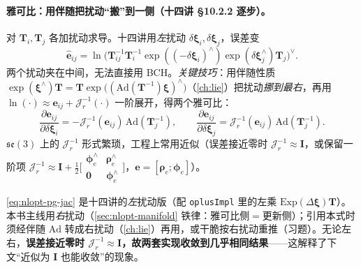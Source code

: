 \paragraph{雅可比：用伴随把扰动“搬”到一侧（十四讲 §10.2.2 逐步）。}\cite{gaoxiang2019slam14}
对 $\mathbf{T}_i,\mathbf{T}_j$ 各加扰动求导。十四讲用\emph{左}扰动 $\delta\boldsymbol{\xi}_i,\delta\boldsymbol{\xi}_j$，误差变
\begin{equation}
  \hat{\mathbf{e}}_{ij}=\ln\!\big(\mathbf{T}_{ij}^{-1}\mathbf{T}_i^{-1}\exp((-\delta\boldsymbol{\xi}_i)^\wedge)\exp(\delta\boldsymbol{\xi}_j^\wedge)\mathbf{T}_j\big)^\vee.
  \label{eq:nlopt-pg-pert}
\end{equation}
两个扰动夹在中间，无法直接用 BCH。\emph{关键技巧}：用伴随性质 $\exp(\boldsymbol{\xi}^\wedge)\mathbf{T}=\mathbf{T}\exp\big((\mathrm{Ad}(\mathbf{T}^{-1})\boldsymbol{\xi})^\wedge\big)$（\cref{ch:lie}）把扰动\emph{挪到最右}，再用 $\ln(\cdot)\approx\mathbf{e}_{ij}+\mathcal{J}_r^{-1}(\cdot)$ 一阶展开，得两个雅可比：
\begin{equation}
  \frac{\partial\mathbf{e}_{ij}}{\partial\delta\boldsymbol{\xi}_i}=-\mathcal{J}_r^{-1}(\mathbf{e}_{ij})\,\mathrm{Ad}(\mathbf{T}_j^{-1}),\qquad
  \frac{\partial\mathbf{e}_{ij}}{\partial\delta\boldsymbol{\xi}_j}=\mathcal{J}_r^{-1}(\mathbf{e}_{ij})\,\mathrm{Ad}(\mathbf{T}_j^{-1}).
  \label{eq:nlopt-pg-jac}
\end{equation}
$\mathfrak{se}(3)$ 上的 $\mathcal{J}_r^{-1}$ 形式繁琐，工程上常用近似（误差接近零时 $\mathcal{J}_r^{-1}\approx\mathbf{I}$，或保留一阶项 $\mathcal{J}_r^{-1}\approx\mathbf{I}+\tfrac12\big[\begin{smallmatrix}\boldsymbol{\phi}_e^\wedge&\boldsymbol{\rho}_e^\wedge\\\mathbf{0}&\boldsymbol{\phi}_e^\wedge\end{smallmatrix}\big]$，$\mathbf{e}=[\boldsymbol{\rho}_e;\boldsymbol{\phi}_e]$）。

\begin{insight}
\cref{eq:nlopt-pg-jac} 是十四讲的\emph{左}扰动版（配 \texttt{oplusImpl} 里的左乘 $\mathrm{Exp}(\Delta\boldsymbol{\xi})\mathbf{T}$）。本书主线用\emph{右}扰动（\cref{sec:nlopt-manifold} 铁律：雅可比侧$=$更新侧）；引用本式时须经伴随 $\mathrm{Ad}$ 转成右扰动（\cref{ch:lie}）再用，或干脆按右扰动重推（习题）。无论左右，\textbf{误差接近零时 $\mathcal{J}_r^{-1}\approx\mathbf{I}$，故两套实现收敛到几乎相同结果}——这解释了下文“近似为 $\mathbf{I}$ 也能收敛”的现象。
\end{insight}

